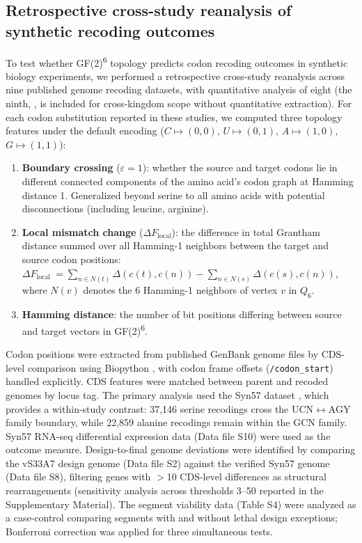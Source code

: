 \documentclass[preprint,11pt,authoryear,a4paper]{elsarticle}
\begin{document}
\subsection{Retrospective cross-study reanalysis of synthetic recoding
outcomes}\label{sec:methods-codonsafe}

To test whether GF(2)\textsuperscript{6} topology predicts codon
recoding outcomes in synthetic biology experiments, we performed a
retrospective cross-study reanalysis across nine published genome
recoding datasets, with quantitative analysis of eight (the ninth,
\citep{ding2024}, is included for cross-kingdom scope without
quantitative extraction). For each codon substitution reported in these
studies, we computed three topology features under the default encoding
(\(C \mapsto (0,0)\), \(U \mapsto (0,1)\), \(A \mapsto (1,0)\),
\(G \mapsto (1,1)\)):

\begin{enumerate}
\item
  \textbf{Boundary crossing} (\(\varepsilon = 1\)): whether the source
  and target codons lie in different connected components of the amino
  acid's codon graph at Hamming distance 1. Generalized beyond serine to
  all amino acids with potential disconnections (including leucine,
  arginine).
\item
  \textbf{Local mismatch change} (\(\Delta F_{\text{local}}\)): the
  difference in total Grantham distance summed over all Hamming-1
  neighbors between the target and source codon positions:
  \(\Delta F_{\text{local }} = \sum_{n \in N(t)}\Delta(c(t),c(n)) - \sum_{n \in N(s)}\Delta(c(s),c(n))\),
  where \(N(v)\) denotes the 6 Hamming-1 neighbors of vertex \(v\) in
  \(Q_{6}\).
\item
  \textbf{Hamming distance}: the number of bit positions differing
  between source and target vectors in GF(2)\textsuperscript{6}.
\end{enumerate}

Codon positions were extracted from published GenBank genome files by
CDS-level comparison using Biopython \citep{cock2009}, with codon frame
offsets (\texttt{/codon\_start}) handled explicitly. CDS features were
matched between parent and recoded genomes by locus tag. The primary
analysis used the Syn57 dataset \citep{robertson2025syn57}, which
provides a within-study contrast: 37,146 serine recodings cross the
UCN\(\leftrightarrow\)AGY family boundary, while 22,859 alanine
recodings remain within the GCN family. Syn57 RNA-seq differential
expression data (Data file S10) were used as the outcome measure.
Design-to-final genome deviations were identified by comparing the
vS33A7 design genome (Data file S2) against the verified Syn57 genome
(Data file S8), filtering genes with \(>\)10 CDS-level differences as
structural rearrangements (sensitivity analysis across thresholds 3--50
reported in the Supplementary Material). The \citep{ostrov2016} segment
viability data (Table S4) were analyzed as a case-control comparing
segments with and without lethal design exceptions; Bonferroni
correction was applied for three simultaneous tests.
\end{document}

